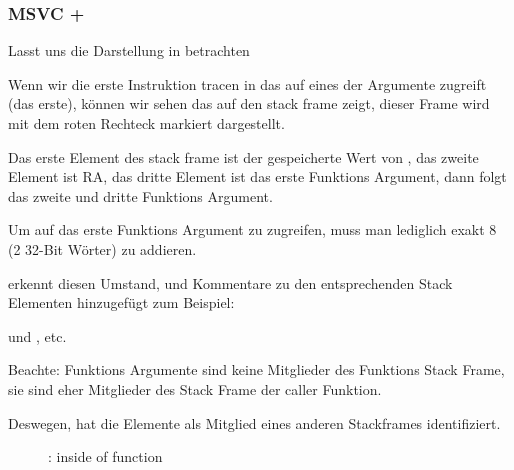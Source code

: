 \subsubsection{MSVC + \olly}
\myindex{\olly}
Lasst uns die Darstellung in \olly betrachten

Wenn wir die erste Instruktion tracen in \ttf das auf eines der Argumente
zugreift (das erste), können wir sehen das \EBP auf den \gls{stack frame} zeigt,
dieser Frame wird mit dem roten Rechteck markiert dargestellt.

Das erste Element des \gls{stack frame} ist der gespeicherte Wert von \EBP,
das zweite Element ist \ac{RA}, das dritte Element ist das erste Funktions Argument, dann
folgt das zweite und dritte Funktions Argument.

Um auf das erste Funktions Argument zu zugreifen, muss man lediglich exakt 8 (2 32-Bit Wörter) zu 
\EBP addieren.

\olly erkennt diesen Umstand, und Kommentare zu den entsprechenden Stack Elementen hinzugefügt zum Beispiel:

 und , etc.

Beachte: Funktions Argumente sind keine Mitglieder des Funktions Stack Frame, sie sind eher
Mitglieder des Stack Frame der \gls{caller} Funktion.

Deswegen, hat \olly die  Elemente als Mitglied eines anderen Stackframes identifiziert.

\begin{figure}[H]
\centering
{}
\caption{\olly: inside of \ttf{} function}
\label{fig:passing_arguments_olly}
\end{figure}

